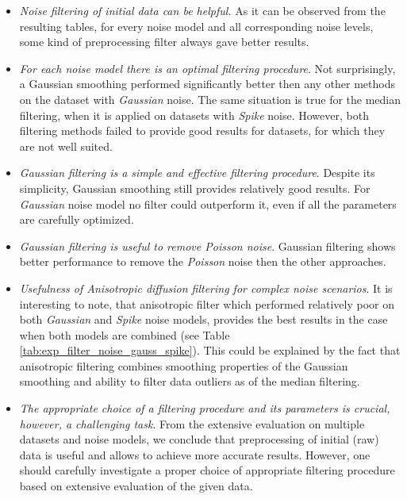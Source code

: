 \begin{itemize}
	\item \textit{Noise filtering of initial data can be helpful.} As it can be observed from the resulting tables, for every noise model and all corresponding noise levels, some kind of preprocessing filter always gave better results.
	    
	\item \textit{For each noise model there is an optimal filtering procedure}. Not surprisingly, a Gaussian smoothing performed significantly better then any other methods on the dataset with \textit{Gaussian} noise. The same situation is true for the median filtering, when it is applied on datasets with \textit{Spike} noise. However, both filtering methods failed to provide good results for datasets, for which they are not well suited. 
	
	\item \textit{Gaussian filtering is a simple and effective filtering procedure}. Despite its simplicity, Gaussian smoothing still provides relatively good results. For \textit{Gaussian} noise model no filter could outperform it, even if all the parameters are carefully optimized.

	\item \textit{Gaussian filtering is useful to remove Poisson noise}. Gaussian filtering shows better performance to remove the \textit{Poisson} noise then the other approaches.  

		\item \textit{Usefulness of Anisotropic diffusion filtering for complex noise scenarios}. It is interesting to note, that anisotropic filter which performed relatively poor on both \textit{Gaussian} and \textit{Spike} noise models, provides the best results in the case when both models are combined (see Table \ref{tab:exp_filter_noise_gauss_spike}). This could be explained by the fact that anisotropic filtering combines smoothing properties of the Gaussian smoothing and ability to filter data outliers as of the median filtering.
				
		\item \textit{The appropriate choice of a filtering procedure and its parameters is crucial, however, a challenging task}.  From the extensive evaluation on multiple datasets and noise models, we conclude that preprocessing of initial (raw) data is useful and allows to achieve more accurate results. However, one should carefully investigate a proper choice of appropriate filtering procedure based on extensive evaluation of the given data.
\end{itemize}


